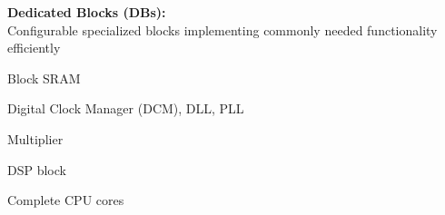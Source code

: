\begin{multicols}{2}
			\textbf{Dedicated Blocks (DBs):} \\
			Configurable specialized blocks implementing commonly needed functionality efficiently
			\begin{compactitem}
				\item Block SRAM
				\item Digital Clock Manager (DCM), DLL, PLL
				\item Multiplier
				\item DSP block
				\item Complete CPU cores
			\end{compactitem}
		\end{multicols}
		
	